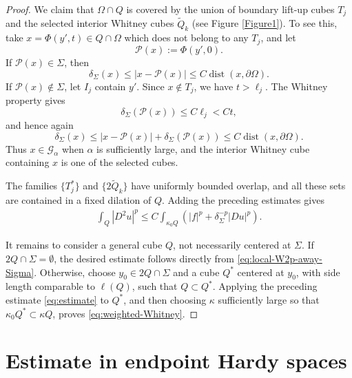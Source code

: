 \documentclass[12pt]{amsart}
\numberwithin{equation}{section}
\newcommand\dist{\operatorname{dist}}
\begin{document}
\begin{proof}
We claim that $\Omega\cap Q$ is covered by the union of boundary lift-up cubes $T_j$ and the selected interior Whitney cubes $\widetilde Q_k$ (see Figure \ref{Figure1}). To see this,
take $x=\Phi(y',t)\in Q\cap\Omega$ which does not belong to any $T_j$, and let
\[
 \mathcal{P}(x):=\Phi(y',0).
\]
If $\mathcal{P}(x)\in\Sigma$, then
\[
 \delta_\Sigma(x)\leq |x-\mathcal{P}(x)|
 \leq C\dist(x,\partial\Omega).
\]
If $\mathcal{P}(x)\notin\Sigma$, let $I_j$ contain $y'$. Since $x\notin T_j$, we have
$t>\ell_j$. The Whitney property gives
\[
 \delta_\Sigma(\mathcal{P}(x))\leq C\ell_j<Ct,
\]
and hence again
\[
 \delta_\Sigma(x)
 \leq |x-\mathcal{P}(x)|+\delta_\Sigma(\mathcal{P}(x))
 \leq C\dist(x,\partial\Omega).
\]
Thus $x\in\mathcal G_\alpha$ when $\alpha$ is sufficiently large, and the
interior Whitney cube containing $x$ is one of the selected cubes.


The families $\{T_j^*\}$ and $\{2\widetilde Q_k\}$ have uniformly bounded
overlap, and all these sets are contained in a fixed dilation of $Q$. Adding
the preceding estimates gives
\begin{align} \label{eq:estimate}
     \int_{Q}|D^2u|^p
 \leq C\int_{\kappa_0Q}
 \left(|f|^p+\delta_\Sigma^{-p}|Du|^p\right).
\end{align}

\medskip

It remains to consider a general cube $Q$, not necessarily centered at $\Sigma$. If
$2Q\cap\Sigma=\emptyset$, the desired estimate follows directly from
\eqref{eq:local-W2p-away-Sigma}. Otherwise, choose $y_0\in2Q\cap\Sigma$ and a cube $Q^*$
centered at $y_0$, with side length comparable to $\ell(Q)$, such that
$Q\subset Q^*$. Applying the preceding estimate \eqref{eq:estimate} to $Q^*$, and then choosing
$\kappa$ sufficiently large so that $\kappa_0Q^*\subset\kappa Q$, proves
\eqref{eq:weighted-Whitney}.
\end{proof}



\section{Estimate in endpoint Hardy spaces} \label{sec-hardy}
\end{document}
